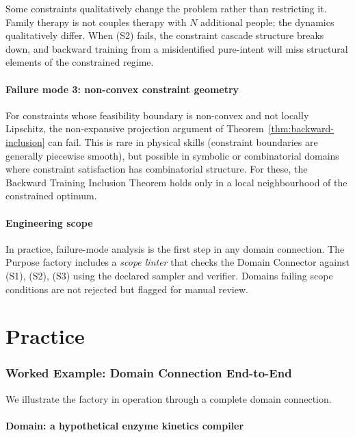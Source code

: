 \documentclass[twocolumn,11pt,a4paper]{article}
\begin{document}
Some constraints qualitatively change the problem rather than restricting it. Family therapy is not couples therapy with $N$ additional people; the dynamics qualitatively differ. When (S2) fails, the constraint cascade structure breaks down, and backward training from a misidentified pure-intent will miss structural elements of the constrained regime.

\subsection{Failure mode 3: non-convex constraint geometry}

For constraints whose feasibility boundary is non-convex and not locally Lipschitz, the non-expansive projection argument of Theorem~\ref{thm:backward-inclusion} can fail. This is rare in physical skills (constraint boundaries are generally piecewise smooth), but possible in symbolic or combinatorial domains where constraint satisfaction has combinatorial structure. For these, the Backward Training Inclusion Theorem holds only in a local neighbourhood of the constrained optimum.

\subsection{Engineering scope}

In practice, failure-mode analysis is the first step in any domain connection. The Purpose factory includes a \emph{scope linter} that checks the Domain Connector against (S1), (S2), (S3) using the declared sampler and verifier. Domains failing scope conditions are not rejected but flagged for manual review.


\part{Practice}
\label{part:practice}

\section{Worked Example: Domain Connection End-to-End}
\label{sec:worked-example}

We illustrate the factory in operation through a complete domain connection.

\subsection{Domain: a hypothetical enzyme kinetics compiler}
\end{document}
